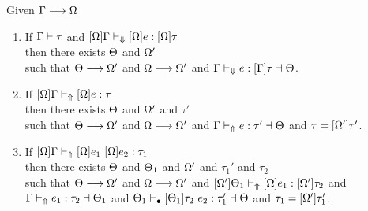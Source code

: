 \begin{theorem}

Given $\Gamma \longrightarrow \Omega$
\begin{enumerate}
    \item If $\Gamma \vdash \tau$ and $[\Omega]\Gamma \vdash_\Downarrow [\Omega]e : [\Omega]\tau$\\
          then there exists $\Theta$ and $\Omega'$\\
          such that $\Theta \longrightarrow \Omega'$ and $\Omega \longrightarrow \Omega'$ and $\Gamma \vdash_\Downarrow e: [\Gamma]\tau \dashv \Theta$.
    \item If $[\Omega]\Gamma \vdash_\Uparrow [\Omega]e : \tau$\\
          then there exists $\Theta$ and $\Omega'$ and $\tau'$\\
          such that $\Theta \longrightarrow \Omega'$ and $\Omega \longrightarrow \Omega'$ and $\Gamma \vdash_\Uparrow e:\tau' \dashv \Theta$ and $\tau = [\Omega']\tau'$.
    \item If $[\Omega]\Gamma \vdash_\Uparrow [\Omega]e_1 ~ [\Omega]e_2 :\tau_1$\\
          then there exists $\Theta$ and $\Theta_1$ and $\Omega'$ and $\tau_1'$ and $\tau_2$\\
          such that $\Theta \longrightarrow \Omega'$ and $\Omega \longrightarrow \Omega'$ and $[\Omega']\Theta_1 \vdash_\Uparrow [\Omega]e_1 :[\Omega']\tau_2$ and $\Gamma \vdash_\Uparrow e_1 : \tau_2 \dashv \Theta_1$ and $\Theta_1 \vdash_\bullet [\Theta_1]\tau_2 ~ e_2 :\tau_1' \dashv \Theta$ and $\tau_1 = [\Omega']\tau_1'$.
\end{enumerate}
\end{theorem}
